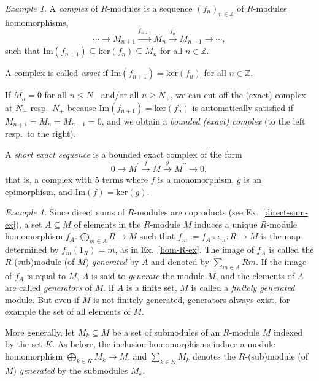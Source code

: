 \documentclass{amsart}
\theoremstyle{plain}
\numberwithin{equation}{section} %
\numberwithin{figure}{section} %
\theoremstyle{plain}
\theoremstyle{plain}
\theoremstyle{plain}
\theoremstyle{plain}
\theoremstyle{plain}
\theoremstyle{plain}
\theoremstyle{remark}
\theoremstyle{remark}
\theoremstyle{remark}
\newtheorem{exm}[thm]{Example}
\begin{document}
\begin{exm} \label{mod-complex-exm}
A \textit{complex} of $R$-modules is a sequence $(f_n)_{n \in \mathbb{Z}}$ of $R$-modules homomorphisms, 
\[ \cdots \rightarrow M_{n+1} \stackrel{f_{n+1}}{\rightarrow} M_n \stackrel{f_n}{\rightarrow} M_{n-1} \rightarrow \cdots , \]
such that $\mathrm{Im}(f_{n+1}) \subseteq \mathrm{ker}(f_n) \subseteq M_n$ for all $n \in \mathbb{Z}$. 

A complex is called \textit{exact} if $\mathrm{Im}(f_{n+1}) = \mathrm{ker}(f_n)$ for all $n \in \mathbb{Z}$.

If $M_n = 0$ for all $n \leq N_-$ and/or all $n \geq N_+$, we can cut off the (exact) complex at $N_-$ resp.\ $N_+$ because $\mathrm{Im}(f_{n+1}) = \mathrm{ker}(f_n)$ is automatically satisfied if $M_{n+1} = M_n = M_{n-1} = 0$, and we obtain a \textit{bounded (exact) complex} (to the left resp.\ to the right).  

A \textit{short exact sequence} is a bounded exact complex of the form
\[ 0 \rightarrow M^\prime \stackrel{f}{\rightarrow} M \stackrel{g}{\rightarrow} M^{\prime\prime} \rightarrow 0, \]
that is, a complex with $5$ terms where $f$ is a monomorphism, $g$ is an epimorphism, and $\mathrm{Im}(f) = \mathrm{ker}(g)$.
\end{exm}

\begin{exm}
Since direct sums of $R$-modules are coproducts (see Ex.~\ref{direct-sum-ex}), a set $A \subseteq M$ of elements in the $R$-module $M$ induces a unique $R$-module homomorphism $f_A: \bigoplus_{m \in A} R \rightarrow M$ such that $f_m := f_A \circ \iota_m: R \rightarrow M$ is the map determined by $f_m(1_R) = m$, as in Ex.~\ref{hom-R-ex}. The image of $f_A$ is called the $R$-(sub)module (of $M$) \textit{generated} by $A$ and denoted by $\sum_{m \in A} Rm$. If the image of $f_A$ is equal to $M$, $A$ is said to \textit{generate} the module $M$, and the elements of $A$ are called \textit{generators} of $M$. If $A$ is a finite set, $M$ is called a \textit{finitely generated} module. But even if $M$ is not finitely generated, generators always exist, for example the set of all elements of $M$.

More generally, let $M_k \subseteq M$ be a set of submodules of an $R$-module $M$ indexed by the set $K$. As before, the inclusion homomorphisms induce a module homomorphism $\bigoplus_{k \in K} M_k \rightarrow M$, and $\sum_{k \in K} M_k$ denotes the $R$-(sub)module (of $M$) \textit{generated} by the submodules $M_k$. 
\end{exm}
\end{document}
